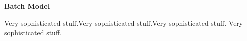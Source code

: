 \begin{center} \textbf{\huge Batch Model} \end{center}
Very sophisticated stuff.Very sophisticated stuff.Very sophisticated stuff. Very sophisticated stuff.
